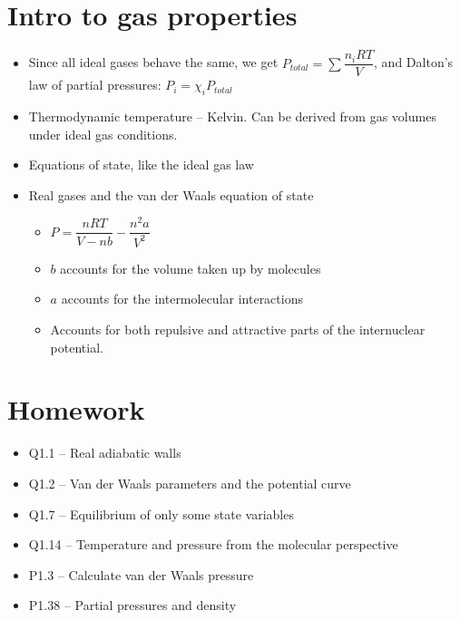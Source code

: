 \documentclass[12pt, openany, letterpaper]{memoir}
\begin{document}
\section*{Intro to gas properties}
\begin{itemize}
	\item Since all ideal gases behave the same, we get $P_{total} = \sum\dfrac{n_iRT}{V}$, and Dalton's law of partial pressures: $P_i=\chi_iP_{total}$
	\item Thermodynamic temperature -- Kelvin. Can be derived from gas volumes under ideal gas conditions.
	\item Equations of state, like the ideal gas law
	\item Real gases and the van der Waals equation of state
	\begin{itemize}
		\item $P=\dfrac{nRT}{V-nb}-\dfrac{n^2a}{V^2}$
		\item $b$ accounts for the volume taken up by molecules
		\item $a$ accounts for the intermolecular interactions
		\item Accounts for both repulsive and attractive parts of the internuclear potential.
	\end{itemize}
\end{itemize}
\section*{Homework}
\begin{itemize}
	\item Q1.1 -- Real adiabatic walls
	\item Q1.2 -- Van der Waals parameters and the potential curve
	\item Q1.7 -- Equilibrium of only some state variables
	\item Q1.14 -- Temperature and pressure from the molecular perspective
	\item P1.3 -- Calculate van der Waals pressure
	\item P1.38 -- Partial pressures and density
\end{itemize}
\end{document}
